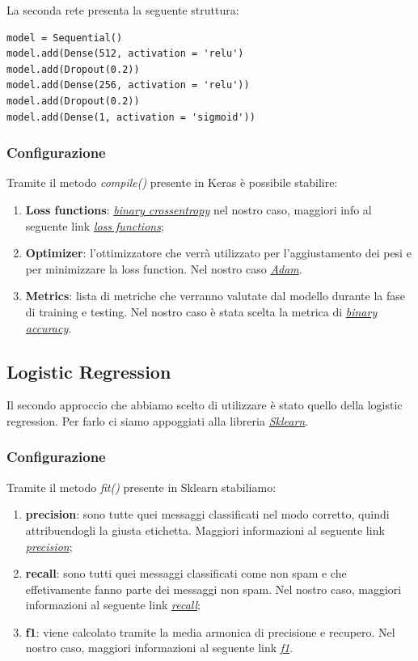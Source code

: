 La seconda rete presenta la seguente struttura:
\begin{lstlisting}[backgroundcolor = \color{white}]
model = Sequential()
model.add(Dense(512, activation = 'relu')
model.add(Dropout(0.2))
model.add(Dense(256, activation = 'relu'))
model.add(Dropout(0.2))
model.add(Dense(1, activation = 'sigmoid'))
\end{lstlisting}


\subsubsection{Configurazione}
Tramite il metodo \textit{compile()} presente in Keras è possibile stabilire:
\begin{enumerate}
	\item \textbf{Loss functions}: \href{https://en.wikipedia.org/wiki/Cross_entropy}{\textit{binary crossentropy}} nel nostro caso, maggiori info al seguente link \href{https://keras.io/losses/}{\textit{loss functions}};
	\item \textbf{Optimizer}: l'ottimizzatore che verrà utilizzato per l'aggiustamento dei pesi e per minimizzare la loss function.
	Nel nostro caso \href{https://arxiv.org/pdf/1412.6980v8.pdf}{\textit{Adam}}. 
	\item \textbf{Metrics}: lista di metriche che verranno valutate dal modello durante la fase di training e testing.
	Nel nostro caso è stata scelta la metrica di \href{https://keras.io/metrics/#binary_accuracy}{\textit{binary accuracy}}.  
\end{enumerate} 
\subsection{Logistic Regression}
Il secondo approccio che abbiamo scelto di utilizzare è stato quello della logistic regression.
Per farlo ci siamo appoggiati alla libreria \href{https://scikit-learn.org/stable/}{\textit{Sklearn}}.
\subsubsection{Configurazione}
Tramite il metodo \textit{fit()} presente in Sklearn stabiliamo:
\begin{enumerate}
	\item \textbf{precision}: sono tutte quei messaggi classificati nel modo corretto, quindi attribuendogli la giusta etichetta. Maggiori informazioni al seguente link \href{https://scikit-learn.org/stable/modules/generated/sklearn.metrics.precision_score.html#sklearn.metrics.precision_score}{\textit{precision}};	
	\item \textbf{recall}: sono tutti quei messaggi classificati come non spam e che effetivamente fanno parte dei messaggi non spam. Nel nostro caso, maggiori informazioni al seguente link \href{https://scikit-learn.org/stable/modules/generated/sklearn.metrics.recall\_score.html#sklearn.metrics.recall\_score}{\textit{recall}};
	\item \textbf{f1}: viene calcolato tramite la media armonica di precisione e recupero. Nel nostro caso, maggiori informazioni al seguente link \href{https://scikit-learn.org/stable/modules/generated/sklearn.metrics.f1_score.html}{\textit{f1}}.  
\end{enumerate} 
